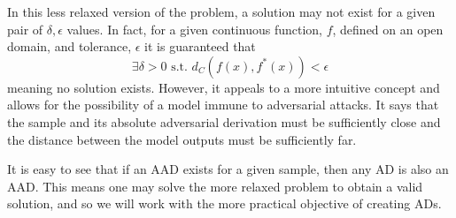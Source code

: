 \noindent
In this less relaxed version of the problem, a solution may not exist for a given pair of $\delta, \epsilon$ values.  In fact, for a given continuous function, $f$, defined on an open domain, and tolerance, $\epsilon$ it is guaranteed that $$\exists \delta > 0 \text{ s.t. } d_C(f(x),f^*(x)) < \epsilon$$ meaning no solution exists.  However, it appeals to a more intuitive concept and allows for the possibility of a model immune to adversarial attacks.  It says that the sample and its absolute adversarial derivation must be sufficiently close and the distance between the model outputs must be sufficiently far.  

It is easy to see that if an AAD exists for a given sample, then any AD is also an AAD.  This means one may solve the more relaxed problem to obtain a valid solution, and so we will work with the more practical objective of creating ADs.
